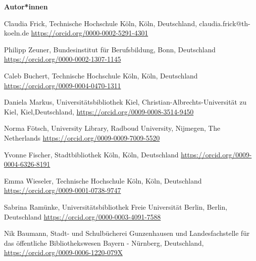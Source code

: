 \documentclass[a4paper,
fontsize=11pt,
oneside,
numbers=noperiodatend,
parskip=half-,
bibliography=totoc,
final
]{scrartcl}
\begin{document}
\textbf{Autor*innen}

Claudia Frick, Technische Hochschule Köln, Köln, Deutschland, claudia.frick@th-koeln.de\newline
\url{https://orcid.org/0000-0002-5291-4301}

Philipp Zeuner, Bundesinstitut für Berufsbildung, Bonn, Deutschland\newline
\url{https://orcid.org/0000-0002-1307-1145}

Caleb Buchert, Technische Hochschule Köln, Köln, Deutschland\newline
\url{https://orcid.org/0009-0004-0470-1311}

Daniela Markus, Universitätsbibliothek Kiel, Christian-Albrechts-Universität zu Kiel, Kiel,\linebreak Deutschland, \url{https://orcid.org/0009-0008-3514-9450}

Norma Fötsch, University Library, Radboud University, Nijmegen, The Netherlands\newline
\url{https://orcid.org/0009-0009-7009-5520}

Yvonne Fischer, Stadtbibliothek Köln, Köln, Deutschland\newline
\url{https://orcid.org/0009-0004-6326-8191}

Emma Wieseler, Technische Hochschule Köln, Köln, Deutschland\newline
\url{https://orcid.org/0009-0001-0738-9747}

Sabrina Ramünke, Universitätsbibliothek Freie Universität Berlin, Berlin, Deutschland\newline
\url{https://orcid.org/0000-0003-4091-7588}

Nik Baumann, Stadt- und Schulbücherei Gunzenhausen und Landesfachstelle für das öffentliche Bibliothekswesen Bayern - Nürnberg, Deutschland, \url{https://orcid.org/0009-0006-1220-079X}
\end{document}
